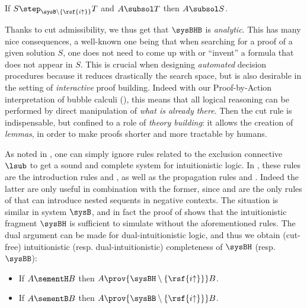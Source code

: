 \begin{fact}\label{cor:subformula-property}
  If $S \step_{\sysB \setminus \{\rsf{i{\uparrow}}\}} T$ and $A \subsol T$ then
  $A \subsol S$.
\end{fact}

Thanks to cut admissibility, we thus get that $\sysBHB$ is \emph{analytic}. This
has many nice consequences, a well-known one being that when searching for a
proof of a given solution $S$, one does not need to come up with or ``invent'' a
formula that does not appear in $S$. This is crucial when designing
\emph{automated} decision procedures because it reduces drastically the search
space, but is also desirable in the setting of \emph{interactive} proof
building. Indeed with our Proof-by-Action interpretation of bubble calculi
(), this means that all logical reasoning can be performed
by direct manipulation of \emph{what is already there}. Then the cut rule is
indispensable, but confined to a role of \emph{theory building}: it allows the
creation of \emph{lemmas}, in order to make proofs shorter and more tractable by
humans.

As noted in \cite{postniece_deep_2009}, one can simply ignore rules related to
the exclusion connective $\lsub$ to get a sound and complete system for
intuitionistic logic. In , these rules are the introduction rules
 and , as well as the propagation rules
 and . Indeed the latter are only useful in
combination with the former, since  and  are the
only rules of  that can introduce nested sequents in negative
contexts. The situation is similar in system $\sysB$, and in fact the proof of
 shows that the intuitionistic fragment $\sysBH$ is
sufficient to simulate  without the aforementioned rules. The dual
argument can be made for dual-intuitionistic logic, and thus we obtain
(cut-free) intuitionistic (resp. dual-intuitionistic) completeness of $\sysBH$
(resp. $\sysBB$):

\begin{corollary}
  \sbr
  \begin{itemize}
    \item If $A \sementH B$ then $A \prov{\sysBH \setminus
    \{\rsf{i{\uparrow}}\}} B$.
    \item If $A \sementB B$ then $A \prov{\sysBB \setminus
    \{\rsf{i{\uparrow}}\}} B$.
  \end{itemize}
\end{corollary}

